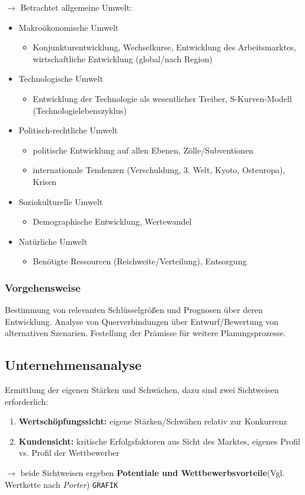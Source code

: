 \documentclass[a4paper,11pt, twoside]{article}
\newcommand\mpar[1]{\marginpar {\flushleft\small #1}}
\begin{document}
$\rightarrow$ Betrachtet allgemeine Umwelt:
\begin{itemize}
	\item Makroökonomische Umwelt
	\begin{itemize}
		\item Konjunkturentwicklung, Wechselkurse, Entwicklung des Arbeitsmarktes, wirtschaftliche Entwicklung (global/nach Region)
	\end{itemize}
	\item Technologische Umwelt
	\begin{itemize}
		\item Entwicklung der Technologie als wesentlicher Treiber, S-Kurven-Modell (Technologielebenszyklus)
	\end{itemize}
	\item Politisch-rechtliche Umwelt
	\begin{itemize}
		\item politische Entwicklung auf allen Ebenen, Zölle/Subventionen
		\item internationale Tendenzen (Verschuldung, 3. Welt, Kyoto, Osteuropa), Krisen
	\end{itemize}
	\item Soziokulturelle Umwelt
	\begin{itemize}
		\item Demographische Entwicklung, Wertewandel
	\end{itemize}
	\item Natürliche Umwelt
	\begin{itemize}
		\item Benötigte Ressourcen (Reichweite/Verteilung), Entsorgung
	\end{itemize}
\end{itemize}

\subsubsection*{Vorgehensweise}
Bestimmung von relevanten Schlüsselgrößen und Prognosen über deren Entwicklung. Analyse von Querverbindungen über Entwurf/Bewertung von alternativen Szenarien. Festellung der Prämisse für weitere Planungsprozesse.

\subsection{Unternehmensanalyse}

Ermittlung der eigenen Stärken und Schwächen, dazu sind zwei Sichtweisen erforderlich:
\begin{enumerate}
	\item \textbf{Wertschöpfungssicht:} eigene Stärken/Schwähen relativ zur Konkurrenz
	\item \textbf{Kundensicht:} kritische Erfolgsfaktoren aus Sicht des Marktes, eigenes Profil vs. Profil der Wettbewerber
\end{enumerate}
$\rightarrow$ beide Sichtweisen ergeben \textbf{Potentiale und Wettbewerbsvorteile}(Vgl. Wertkette nach \textit{Porter})
	\mpar{\textcolor{red}{Abschätzung der eigenen preislichen Lage auf dem Markt}}
\texttt{GRAFIK}
\end{document}
